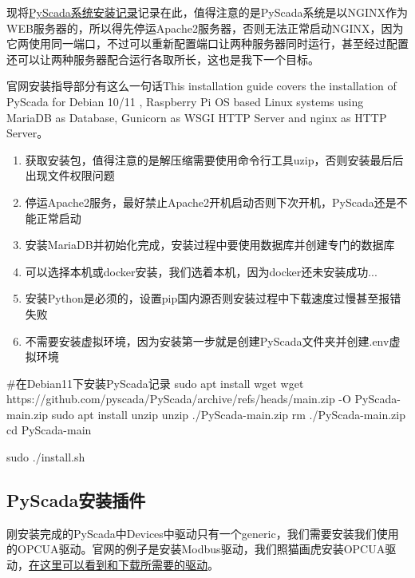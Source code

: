 	现将\href{https://blog.csdn.net/XKPP023/article/details/140079389?spm=1001.2014.3001.5506}{PyScada系统安装记录}记录在此，值得注意的是PyScada系统是以NGINX作为WEB服务器的，所以得先停运Apache2服务器，否则无法正常启动NGINX，因为它两使用同一端口，不过可以重新配置端口让两种服务器同时运行，甚至经过配置还可以让两种服务器配合运行各取所长，这也是我下一个目标。

官网安装指导部分有这么一句话This installation guide covers the installation of PyScada for Debian 10/11 , Raspberry Pi OS based Linux systems using MariaDB as Database, Gunicorn as WSGI HTTP Server and nginx as HTTP Server。
\begin{enumerate}
	\item 获取安装包，值得注意的是解压缩需要使用命令行工具uzip，否则安装最后后出现文件权限问题
	\item 停运Apache2服务，最好禁止Apache2开机启动否则下次开机，PyScada还是不能正常启动
	\item 安装MariaDB并初始化完成，安装过程中要使用数据库并创建专门的数据库
	\item 可以选择本机或docker安装，我们选着本机，因为docker还未安装成功...
	\item 安装Python是必须的，设置pip国内源否则安装过程中下载速度过慢甚至报错失败
	\item 不需要安装虚拟环境，因为安装第一步就是创建PyScada文件夹并创建.env虚拟环境
\end{enumerate}
\begin{shell}
#在Debian11下安装PyScada记录
sudo apt install wget
wget https://github.com/pyscada/PyScada/archive/refs/heads/main.zip -O PyScada-main.zip
sudo apt install unzip
unzip ./PyScada-main.zip
rm ./PyScada-main.zip
cd PyScada-main

sudo ./install.sh


\end{shell}
\subsection{PyScada安装插件}
刚安装完成的PyScada中Devices中驱动只有一个generic，我们需要安装我们使用的OPCUA驱动。官网的例子是安装Modbus驱动，我们照猫画虎安装OPCUA驱动，\href{https://github.com/pyscada/}{在这里可以看到和下载所需要的驱动}。
